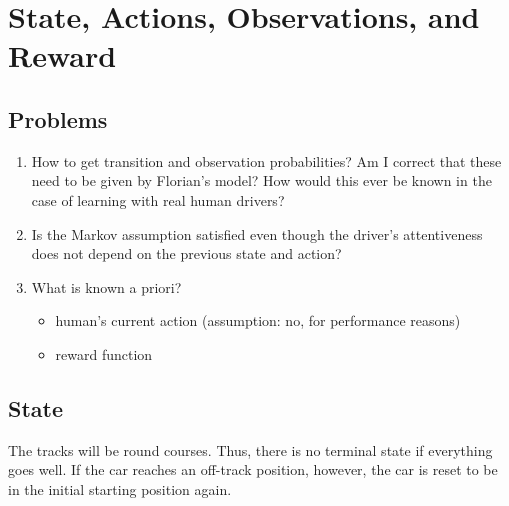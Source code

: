 \chapter*{State, Actions, Observations, and Reward}
\label{sec:problem}



\section{Problems}

\begin{enumerate}
    \item How to get transition and observation probabilities? Am I correct that these need to be given by Florian's model? How would this ever be known in the case of learning with real human drivers?
    \item Is the Markov assumption satisfied even though the driver's attentiveness does not depend on the previous state and action?
    \item What is known a priori?
    \begin{itemize}
        \item human's current action (assumption: no, for performance reasons)
        \item reward function
    \end{itemize}
\end{enumerate}

\newpage

\section{State}

The tracks will be round courses. Thus, there is no terminal state if everything goes well. If the car reaches an off-track position, however, the car is reset to be in the initial starting position again.\\

